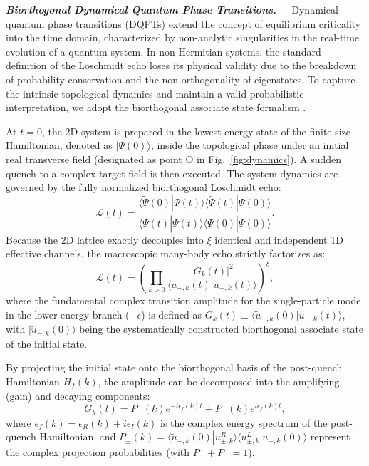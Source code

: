 \documentclass[aps,prb,floatfix,superscriptaddress,reprint]{revtex4-2}
\begin{document}
\vspace{2mm}
\noindent \textbf{\textit{Biorthogonal Dynamical Quantum Phase Transitions.---}}
Dynamical quantum phase transitions (DQPTs) extend the concept of equilibrium criticality into the time domain, characterized by non-analytic singularities in the real-time evolution of a quantum system. In non-Hermitian systems, the standard definition of the Loschmidt echo loses its physical validity due to the breakdown of probability conservation and the non-orthogonality of eigenstates. To capture the intrinsic topological dynamics and maintain a valid probabilistic interpretation, we adopt the biorthogonal associate state formalism \cite{Hu2024_1}.

At $t=0$, the 2D system is prepared in the lowest energy state of the finite-size Hamiltonian, denoted as $|\Psi(0)\rangle$, inside the topological phase under an initial real transverse field (designated as point O in Fig.~\ref{fig:dynamics}). A sudden quench to a complex target field is then executed. The system dynamics are governed by the fully normalized biorthogonal Loschmidt echo:
\begin{equation}
    \mathcal{L}(t) = \frac{\langle \tilde{\Psi}(0) | \Psi(t) \rangle \langle \tilde{\Psi}(t) | \Psi(0) \rangle}{\langle \tilde{\Psi}(t) | \Psi(t) \rangle \langle \tilde{\Psi}(0) | \Psi(0) \rangle}.
\end{equation}
Because the 2D lattice exactly decouples into $\xi$ identical and independent 1D effective channels, the macroscopic many-body echo strictly factorizes as:
\begin{equation}
    \mathcal{L}(t) = \left( \prod_{k>0} \frac{|G_k(t)|^2}{\langle \tilde{u}_{-,k}(t) | u_{-,k}(t) \rangle} \right)^\xi,
\end{equation}
where the fundamental complex transition amplitude for the single-particle mode in the lower energy branch ($-\epsilon$) is defined as $G_k(t) \equiv \langle \tilde{u}_{-,k}(0) | u_{-,k}(t) \rangle$, with $|\tilde{u}_{-,k}(0)\rangle$ being the systematically constructed biorthogonal associate state of the initial state.

By projecting the initial state onto the biorthogonal basis of the post-quench Hamiltonian $H_f(k)$, the amplitude can be decomposed into the amplifying (gain) and decaying components:
\begin{equation}
    G_k(t) = P_+(k) e^{-i \epsilon_f(k) t} + P_-(k) e^{i \epsilon_f(k) t},
\end{equation}
where $\epsilon_f(k) = \epsilon_R(k) + i\epsilon_I(k)$ is the complex energy spectrum of the post-quench Hamiltonian, and $P_\pm(k) = \langle \tilde{u}_{-,k}(0) | u_{\pm,k}^R \rangle \langle u_{\pm,k}^L | u_{-,k}(0) \rangle$ represent the complex projection probabilities (with $P_+ + P_- = 1$).
\end{document}
